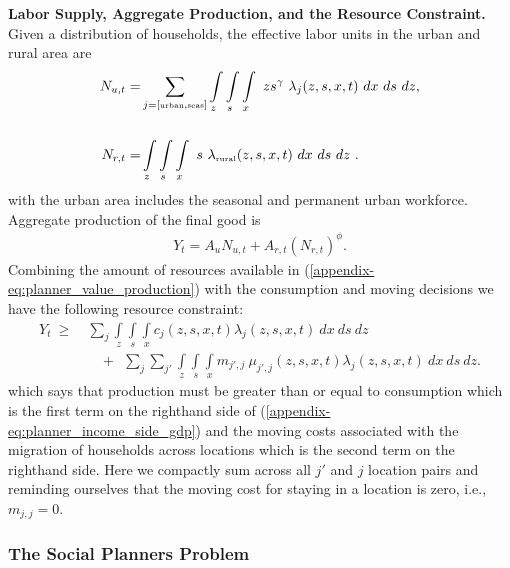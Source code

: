 \documentclass[12pt,pdftex]{article}
\begin{document}
\begin{onehalfspacing}
\textbf{Labor Supply, Aggregate Production, and the Resource Constraint.} Given a distribution of households, the effective labor units in the urban and rural area are
\begin{align}
N_{u,t} =& \sum_{j = [\mbox{\tiny urban}, \mbox{\tiny seas}]}\int\limits_{z} \int\limits_{s} \int\limits_{x} \  z s^{\gamma} \ \lambda_j(z, s, x, t) \ dx \ ds \ dz, \nonumber
\\
\nonumber \\
N_{r,t} =& \int\limits_{z} \int\limits_{s} \int\limits_{x} \ s \ \lambda_{\mbox{\tiny rural}}(z, s, x, t)\ dx \ ds \ dz \ .
\label{appendix-eq:planner_labor_supply}
\end{align}
with the urban area includes the seasonal and permanent urban workforce. Aggregate production of the final good is
\begin{align}
Y_t = A_u N_{u,t} + A_{r,t} \left(N_{r,t} \right)^{\phi}.
\label{appendix-eq:planner_value_production}
\end{align}
Combining the amount of resources available in (\ref{appendix-eq:planner_value_production}) with the consumption and moving decisions we have the following resource constraint:
\begin{align}
Y_t\  \geq \ & \sum_{j} \int\limits_{z} \int\limits_{s} \int\limits_{x} c_{j}(z, s, x, t) \lambda_{j}(z, s, x, t) \ dx \ ds \ dz  \nonumber \\
& \ \ \ \ +  \ \  \sum_{j}\sum_{j'} \int\limits_{z} \int\limits_{s} \int\limits_{x}  m_{j',j} \ \mu_{j',j}(z,s, x, t) \lambda_{j}(z, s, x, t) \ dx \ ds \ dz.
\label{appendix-eq:planner_income_side_gdp}
\end{align}
which says that production must be greater than or equal to consumption which is the first term on the righthand side of (\ref{appendix-eq:planner_income_side_gdp}) and the moving costs associated with the migration of households across locations which is the second term on the righthand side. Here we compactly sum across all $j'$ and $j$ location pairs and reminding ourselves that the moving cost for staying in a location is zero, i.e., $m_{j,j} = 0$.

\subsubsection{The Social Planners Problem}


\end{onehalfspacing}
\end{document}
